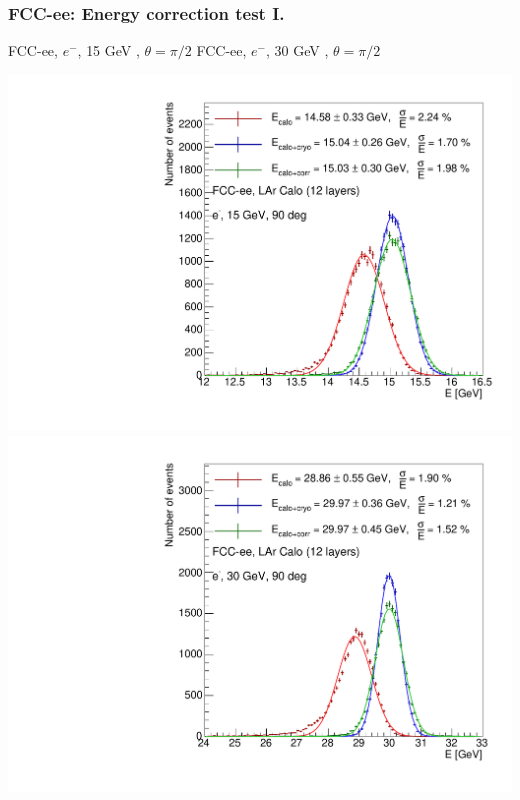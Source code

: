 \documentclass[aspectratio=169]{beamer}
\newcommand{\redtext}[1]{%
  \textcolor{myRed}{#1}
}
\begin{document}
\begin{frame}
  \frametitle{FCC-ee: Energy correction test I.}

  \centering
  FCC-ee, $e^{-}$, \redtext{15 GeV}, $\theta = \pi/2$ \hspace{8mm}
  FCC-ee, $e^{-}$, \redtext{30 GeV}, $\theta = \pi/2$ \\[1.5ex]
  \begin{adjustwidth}{-9mm}{-9mm}
    \includegraphics[width=0.49\linewidth]{figures/12layers/hist_energy_corr_validation_90deg_15GeV.pdf}
    \includegraphics[width=0.49\linewidth]{figures/12layers/hist_energy_corr_validation_90deg_30GeV.pdf}
  \end{adjustwidth}
\end{frame}
\end{document}
